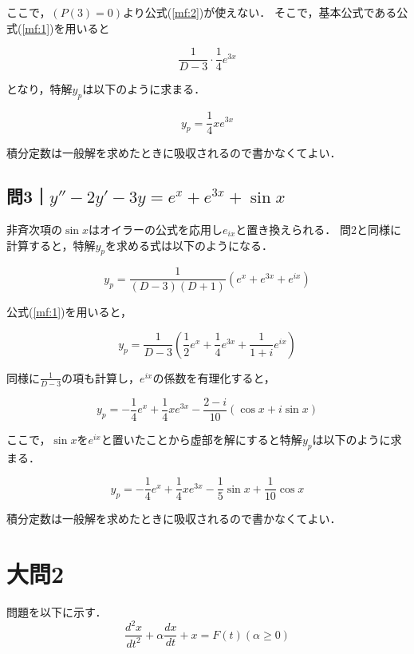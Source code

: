 \documentclass[a4paper,11pt]{bxjsarticle}
\begin{document}
ここで，$(P(3)= 0)$より公式(\ref{mf:2})が使えない．
そこで，基本公式である公式(\ref{mf:1})を用いると

\begin{equation}
  \frac{1}{D-3}\cdot\frac{1}{4}e^{3x}
\end{equation}

となり，特解$y_p$は以下のように求まる．

\begin{equation}
  y_p=\frac{1}{4}xe^{3x}
\end{equation}

積分定数は一般解を求めたときに吸収されるので書かなくてよい．

\subsection{問3｜$y''-2y'-3y=e^x+e^{3x}+\sin x$}
非斉次項の$\sin x$はオイラーの公式を応用し$e_{ix}$と置き換えられる．
問2と同様に計算すると，特解$y_p$を求める式は以下のようになる．

\begin{equation}
  y_p = \frac{1}{(D - 3)(D + 1)}(e^x + e^{3x} + e^{ix})
\end{equation}

公式(\ref{mf:1})を用いると，

\begin{equation}
  y_p = \frac{1}{D - 3}(\frac{1}{2}e^x + \frac{1}{4}e^{3x} + \frac{1}{1+i}e^{ix})
\end{equation}

同様に$\frac{1}{D-3}$の項も計算し，$e^{ix}$の係数を有理化すると，

\begin{equation}
  y_p = -\frac{1}{4}e^x + \frac{1}{4}xe^{3x} - \frac{2 - i}{10}(\cos x + i\sin x)
\end{equation}

ここで，$\sin x$を$e^{ix}$と置いたことから虚部を解にすると特解$y_p$は以下のように求まる．

\begin{equation}
  y_p = -\frac{1}{4}e^x + \frac{1}{4}xe^{3x} - \frac{1}{5}\sin x + \frac{1}{10}\cos x
\end{equation}

積分定数は一般解を求めたときに吸収されるので書かなくてよい．

\section{大問2}
問題を以下に示す．
\begin{equation}
  \frac{d^2x}{dt^2}+\alpha \frac{dx}{dt}+x=F(t)　(\alpha \geq 0)
  \label{equ:2-1}
\end{equation}
\end{document}

